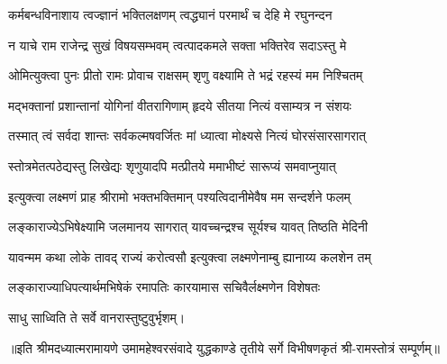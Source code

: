 \twolineshloka
{कर्मबन्धविनाशाय त्वज्ज्ञानं भक्तिलक्षणम्}
{त्वद्ध्यानं परमार्थं च देहि मे रघुनन्दन} %

\twolineshloka
{न याचे राम राजेन्द्र सुखं विषयसम्भवम्}
{त्वत्पादकमले सक्ता भक्तिरेव सदाऽस्तु मे} %

\twolineshloka
{ओमित्युक्त्वा पुनः प्रीतो रामः प्रोवाच राक्षसम्}
{शृणु वक्ष्यामि ते भद्रं रहस्यं मम निश्चितम्} %

\twolineshloka
{मद्भक्तानां प्रशान्तानां योगिनां वीतरागिणाम्}
{हृदये सीतया नित्यं वसाम्यत्र न संशयः} %

\twolineshloka
{तस्मात् त्वं सर्वदा शान्तः सर्वकल्मषवर्जितः}
{मां ध्यात्वा मोक्ष्यसे नित्यं घोरसंसारसागरात्} %

\twolineshloka
{स्तोत्रमेतत्पठेद्यस्तु लिखेद्यः शृणुयादपि}
{मत्प्रीतये ममाभीष्टं सारूप्यं समवाप्नुयात्} %

\twolineshloka
{इत्युक्त्वा लक्ष्मणं प्राह श्रीरामो भक्तभक्तिमान्}
{पश्यत्विदानीमेवैष मम सन्दर्शने फलम्} %

\twolineshloka
{लङ्काराज्येऽभिषेक्ष्यामि जलमानय सागरात्}
{यावच्चन्द्रश्च सूर्यश्च यावत् तिष्ठति मेदिनी} %

\twolineshloka
{यावन्मम कथा लोके तावद् राज्यं करोत्वसौ}
{इत्युक्त्वा लक्ष्मणेनाम्बु ह्यानाय्य कलशेन तम्} %

\twolineshloka
{लङ्काराज्याधिपत्यार्थमभिषेकं रमापतिः}
{कारयामास सचिवैर्लक्ष्मणेन विशेषतः} %

{साधु साध्विति ते सर्वे वानरास्तुष्टुवुर्भृशम्।}

{॥इति श्रीमदध्यात्मरामायणे उमामहेश्वरसंवादे युद्धकाण्डे
तृतीये सर्गे विभीषणकृतं  श्री-रामस्तोत्रं सम्पूर्णम्॥}
